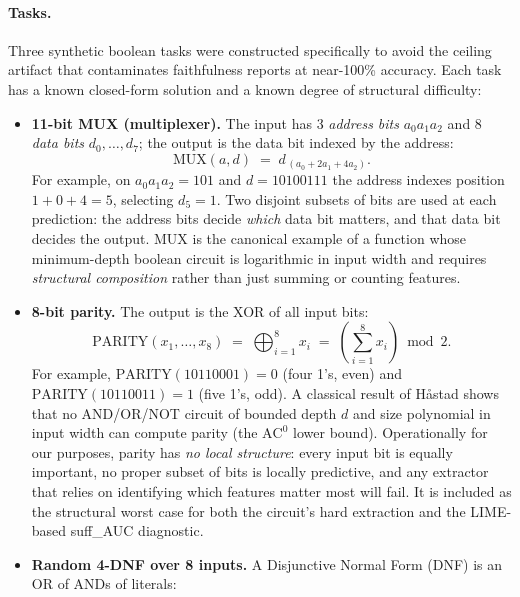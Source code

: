 \documentclass{article}
\begin{document}
\paragraph{Tasks.}
Three synthetic boolean tasks were constructed specifically to avoid the ceiling artifact that contaminates faithfulness reports at near-100\% accuracy.
Each task has a known closed-form solution and a known degree of structural difficulty:
\begin{itemize}
  \item \textbf{11-bit MUX (multiplexer).} The input has 3 \emph{address bits} $a_0 a_1 a_2$ and 8 \emph{data bits} $d_0, \ldots, d_7$; the output is the data bit indexed by the address:
        \begin{equation*}
          \text{MUX}(a, d) \;=\; d_{\,(a_0 + 2 a_1 + 4 a_2)}.
        \end{equation*}
        For example, on $a_0 a_1 a_2 = 101$ and $d = 10100111$ the address indexes position $1 + 0 + 4 = 5$, selecting $d_5 = 1$. Two disjoint subsets of bits are used at each prediction: the address bits decide \emph{which} data bit matters, and that data bit decides the output. MUX is the canonical example of a function whose minimum-depth boolean circuit is logarithmic in input width and requires \emph{structural composition} rather than just summing or counting features.
  \item \textbf{8-bit parity.} The output is the XOR of all input bits:
        \begin{equation*}
          \text{PARITY}(x_1, \ldots, x_8) \;=\; \bigoplus_{i=1}^{8} x_i \;=\; \left(\sum_{i=1}^{8} x_i\right) \bmod 2.
        \end{equation*}
        For example, $\text{PARITY}(10110001) = 0$ (four 1's, even) and $\text{PARITY}(10110011) = 1$ (five 1's, odd). A classical result of H{\aa}stad shows that no AND/OR/NOT circuit of bounded depth $d$ and size polynomial in input width can compute parity (the $\mathrm{AC}^0$ lower bound). Operationally for our purposes, parity has \emph{no local structure}: every input bit is equally important, no proper subset of bits is locally predictive, and any extractor that relies on identifying which features matter most will fail. It is included as the structural worst case for both the circuit's hard extraction and the LIME-based suff\_AUC diagnostic.
  \item \textbf{Random 4-DNF over 8 inputs.} A Disjunctive Normal Form (DNF) is an OR of ANDs of literals:
        \begin{equation*}

\end{equation*}
\end{itemize}
\end{document}
